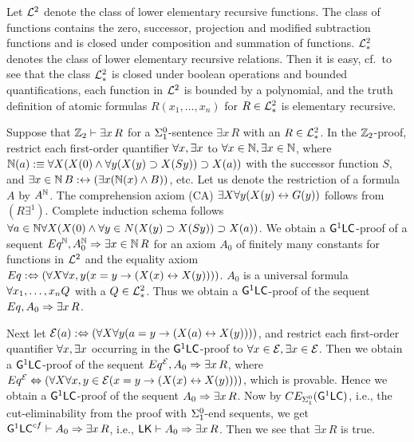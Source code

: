\documentclass{article}
\begin{document}
Let ${\cal L}^{2}$ denote the class of lower elementary recursive functions.
The class of functions contains the zero, successor, projection and modified subtraction functions 
and  is closed under composition and summation of functions. 
${\cal L}^2_*$ denotes the class of lower elementary recursive relations. 
Then it is easy, cf.\,\cite{Rose} to see that
the class ${\cal L}^2_*$ is closed under boolean operations and bounded quantifications,
each function in ${\cal L}^2$ is bounded by a polynomial, and
the truth definition of atomic formulas $R(x_{1},\ldots,x_n)$ for $R\in {\cal L}^2_*$ is elementary recursive.

Suppose that $\mathbb{Z}_{2}\vdash\exists x\, R$ for a $\Sigma^{0}_{1}$-sentence $\exi x\, R$ with an $R\in{\cal L}^{2}_{*}$.
In the $\mathbb{Z}_{2}$-proof,
restrict each first-order quantifier $\forall x,\exists x$ to
$\forall x\in\mathbb{N},\exists x\in\mathbb{N}$, where 
$\mathbb{N}(a):\equiv\forall X(X(0)\land\forall y(X(y)\supset X(Sy))\supset X(a))$ with the successor function $S$,
and $\exists x\in\mathbb{N} \,B:\leftrightarrow(\exists x(\mathbb{N}(x)\land B))$, etc.
Let us denote the restriction of a formula $A$ by $A^{\mathbb{N}}$.
The comprehension axiom (CA) $\exists X\forall y(X(y)\leftrightarrow G(y))$ follows from $(R\exi^{1})$.
Complete induction schema follows $\forall a\in \mathbb{N}\forall X(X(0)\land \forall y\in N(X(y)\supset X(Sy))\supset X(a))$.
We obtain a ${\sf G}^{1}{\sf LC}$-proof of a sequent $Eq^{\mathbb{N}},A_{0}^{\mathbb{N}}\Rightarrow \exists x\in\mathbb{N}\, R$
for an axiom $A_{0}$ of finitely many constants for functions in ${\cal L}^{2}$
and the equality axiom $Eq:\Leftrightarrow (\forall X\forall x,y(x=y\to (X(x)\leftrightarrow X(y))))$.
$A_{0}$ is a universal formula $\forall x_{1},\ldots,x_{n} Q$ with a $Q\in{\cal L}^{2}_{*}$.
Thus we obtain a ${\sf G}^{1}{\sf LC}$-proof of the sequent $Eq,A_{0}\Rightarrow \exists x\, R$.

Next let ${\cal E}(a):\Leftrightarrow(\forall X\forall y(a=y\to (X(a)\leftrightarrow X(y))))$, and restrict
each first-order quantifier $\forall x,\exists x$ occurring in the  ${\sf G}^{1}{\sf LC}$-proof to
$\forall x\in {\cal E},\exists x\in {\cal E}$.
Then we obtain a ${\sf G}^{1}{\sf LC}$-proof of the sequent $Eq^{{\cal E}},A_{0}\Rightarrow \exists x\, R$,
where $Eq^{{\cal E}}\Leftrightarrow (\forall X\forall x,y\in{\cal E}(x=y\to (X(x)\leftrightarrow X(y))))$, which is provable.
Hence we obtain a ${\sf G}^{1}{\sf LC}$-proof of the sequent $A_{0}\Rightarrow \exists x\, R$.
Now by $CE_{\Sigma^{0}_{1}}({\sf G}^{1}{\sf LC})$, i.e., the cut-eliminability from the proof with $\Sigma^{0}_{1}$-end sequents, we get
${\sf G}^{1}{\sf LC}^{cf}\vdash A_{0}\Rightarrow \exists x\, R$, i.e., ${\sf LK}\vdash A_{0}\Rightarrow \exists x\, R$.
Then we see that $\exi x\, R$ is true.
\\
\end{document}
